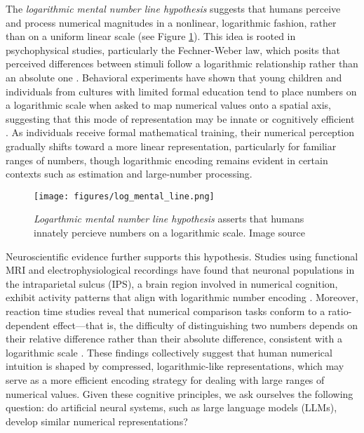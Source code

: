 The \textit{logarithmic mental number line hypothesis} suggests that humans perceive and process numerical magnitudes in a nonlinear, logarithmic fashion, rather than on a uniform linear scale (see Figure \ref{fig log line}). This idea is rooted in psychophysical studies, particularly the Fechner-Weber law, which posits that perceived differences between stimuli follow a logarithmic relationship rather than an absolute one \cite{fechner1860elemente,dehaene2003neural}. Behavioral experiments have shown that young children and individuals from cultures with limited formal education tend to place numbers on a logarithmic scale when asked to map numerical values onto a spatial axis, suggesting that this mode of representation may be innate or cognitively efficient \cite{dehaene2008log, siegler2003development, moeller2009children}. As individuals receive formal mathematical training, their numerical perception gradually shifts toward a more linear representation, particularly for familiar ranges of numbers, though logarithmic encoding remains evident in certain contexts such as estimation and large-number processing.  

\begin{figure}[t]
    \centering
    \texttt{[image: figures/log\_mental\_line.png]} %
    \caption{\textit{Logarthmic mental number line hypothesis} asserts that humans innately percieve numbers on a logarithmic scale. Image source \cite{fritz2013development}}
    \label{fig log line}
\end{figure}

Neuroscientific evidence further supports this hypothesis. Studies using functional MRI and electrophysiological recordings have found that neuronal populations in the intraparietal sulcus (IPS), a brain region involved in numerical cognition, exhibit activity patterns that align with logarithmic number encoding \cite{nieder2009representation, piazza2004tuning}. Moreover, reaction time studies reveal that numerical comparison tasks conform to a ratio-dependent effect—that is, the difficulty of distinguishing two numbers depends on their relative difference rather than their absolute difference, consistent with a logarithmic scale \cite{moyer1967time}. These findings collectively suggest that human numerical intuition is shaped by compressed, logarithmic-like representations, which may serve as a more efficient encoding strategy for dealing with large ranges of numerical values. Given these cognitive principles, we ask ourselves the following question: do artificial neural systems, such as large language models (LLMs), develop similar numerical representations?


